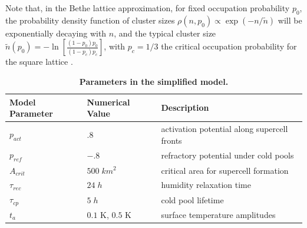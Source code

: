 \documentclass[draft,linenumbers]{agujournal2019}
\begin{document}

Note that, in the Bethe lattice approximation, for fixed occupation probability $p_0$, the probability density function of cluster sizes $\rho(n,p_0)\propto \exp(-n/\tilde{n})$ will be exponentially decaying with $n$, and the typical cluster size $\tilde{n}(p_0)=-\ln \left[ \frac{(1-p_0)p_0}{(1-p_c)p_c}\right]$, with $p_c=1/3$ the critical occupation probability for the square lattice \cite{christensen2005complexity}.
\begin{table}[b]
\begin{tabular}{lll}
    Model Parameter & Numerical Value & Description \\
    \hline
    $p_{act}$ & $.8$ & activation potential along supercell fronts \\ 
    $p_{ref}$ & $-.8$ & refractory potential under cold pools\\
    $A_{crit}$ & $500\;km^2$ & critical area for supercell formation \\
    $\tau_{rec}$ & $24\;h$ & humidity relaxation time \\ 
    $\tau_{cp}$ & $5\;h$ & cold pool lifetime \\ 
    $t_a$ & $0.1$ K, $0.5$ K & surface temperature amplitudes \\
    \hline
\end{tabular}
\caption{{\bf Parameters in the simplified model.}}
\label{tab:parameters}
\end{table}
\end{document}
